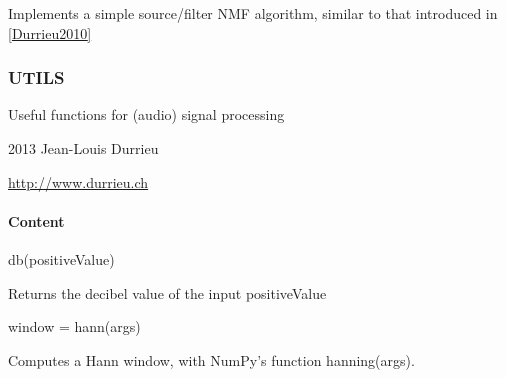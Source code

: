 \documentclass[letterpaper,10pt,english]{sphinxmanual}
\begin{document}

\begin{fulllineitems}
\label{reference/tools:pyfasst.tools.nmf.SFNMF_decomp_init}
Implements a simple source/filter NMF algorithm, similar to that introduced in
{\hyperref[description:durrieu2010]{{[}Durrieu2010{]}}}

\end{fulllineitems}



\subsubsection{UTILS}
\label{reference/tools:utils}\label{reference/tools:module-pyfasst.tools.utils}

Useful functions for (audio) signal processing

2013 Jean-Louis Durrieu

\href{http://www.durrieu.ch}{http://www.durrieu.ch}


\paragraph{Content}
\label{reference/tools:content}

\begin{fulllineitems}
\label{reference/tools:pyfasst.tools.utils.db}
{\hyperref[reference/tools:pyfasst.tools.utils.db]{}} db(positiveValue)

Returns the decibel value of the input positiveValue

\end{fulllineitems}


\begin{fulllineitems}
\label{reference/tools:pyfasst.tools.utils.hann}
window = hann(args)

Computes a Hann window, with NumPy's function hanning(args).

\end{fulllineitems}
\end{document}
